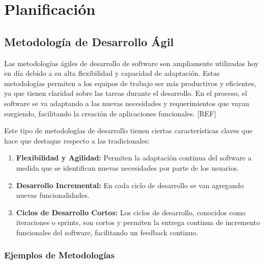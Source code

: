 \chapter{Planificación}
\section{Metodología de Desarrollo Ágil}

Las metodologías ágiles de desarrollo de software son ampliamente utilizadas hoy en día debido a su alta flexibilidad y capacidad de adaptación. Estas metodologías permiten a los equipos de trabajo ser más productivos y eficientes, ya que tienen claridad sobre las tareas durante el desarrollo. En el proceso, el software se va adaptando a las nuevas necesidades y requerimientos que vayan surgiendo, facilitando la creación de aplicaciones funcionales. [REF]

Este tipo de metodologías de desarrollo tienen ciertas características claves que hace que destaque respecto a las tradicionales:

\begin{enumerate}
    \item \textbf{Flexibilidad y Agilidad:} Permiten la adaptación continua del software a medida que se identifican nuevas necesidades por parte de los usuarios.

    \item \textbf{Desarrollo Incremental:} En cada ciclo de desarrollo se van agregando nuevas funcionalidades.

    \item \textbf{Ciclos de Desarrollo Cortos:} Los ciclos de desarrollo, conocidos como iteraciones o sprints, son cortos y permiten la entrega continua de incremento funcionales del software, facilitando un feedback continuo.
\end{enumerate}

\subsection{Ejemplos de Metodologías}

